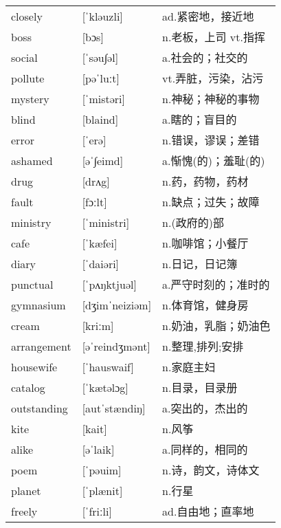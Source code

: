 \documentclass[a4paper]{article}
\begin{document}
\section{}
\begin{tabular}{l l l}

closely & [ˈkləuzli] & ad.紧密地，接近地 \\
boss & [bɔs] & n.老板，上司 vt.指挥 \\
social & [ˈsəu∫əl] & a.社会的；社交的 \\
pollute & [pəˈluːt] & vt.弄脏，污染，沾污 \\
mystery & [ˈmistəri] & n.神秘；神秘的事物 \\
blind & [blaind] & a.瞎的；盲目的 \\
error & [ˈerə] & n.错误，谬误；差错 \\
ashamed & [əˈ∫eimd] & a.惭愧(的)；羞耻(的) \\
drug & [drʌg] & n.药，药物，药材 \\
fault & [fɔːlt] & n.缺点；过失；故障 \\
ministry & [ˈministri] & n.(政府的)部 \\
cafe & [ˈkæfei] & n.咖啡馆；小餐厅 \\
diary & [ˈdaiəri] & n.日记，日记簿 \\
punctual & [ˈpʌŋktjuəl] & a.严守时刻的；准时的 \\
gymnasium & [dʒimˈneiziəm] & n.体育馆，健身房 \\
cream & [kriːm] & n.奶油，乳脂；奶油色 \\
arrangement & [əˈreindʒmənt] & n.整理,排列;安排 \\
housewife & [ˈhauswaif] & n.家庭主妇 \\
catalog & [ˈkætəlɔg] & n.目录，目录册 \\
outstanding & [autˈstændiŋ] & a.突出的，杰出的 \\
kite & [kait] & n.风筝 \\
alike & [əˈlaik] & a.同样的，相同的 \\
poem & [ˈpəuim] & n.诗，韵文，诗体文 \\
planet & [ˈplænit] & n.行星 \\
freely & [ˈfriːli] & ad.自由地；直率地 \\

\end{tabular}
\end{document}
